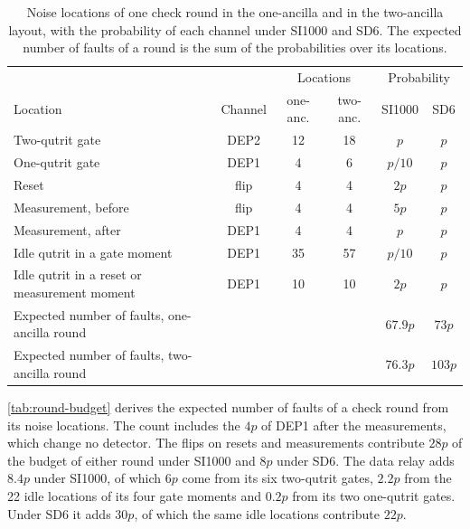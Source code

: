 \begin{table}[tp]
  \centering
  \begin{tabular}{l|c|c|c|c|c}
    \hline
    & & \multicolumn{2}{c|}{Locations} & \multicolumn{2}{c}{Probability} \\
    Location & Channel & one-anc. & two-anc. & SI1000 & SD6 \\
    \hline
    Two-qutrit gate & DEP2 & 12 & 18 & $p$ & $p$ \\
    One-qutrit gate & DEP1 & 4 & 6 & $p/10$ & $p$ \\
    Reset & flip & 4 & 4 & $2p$ & $p$ \\
    Measurement, before & flip & 4 & 4 & $5p$ & $p$ \\
    Measurement, after & DEP1 & 4 & 4 & $p$ & $p$ \\
    Idle qutrit in a gate moment & DEP1 & 35 & 57 & $p/10$ & $p$ \\
    Idle qutrit in a reset or measurement moment & DEP1 & 10 & 10 & $2p$ & $p$ \\
    \hline
    Expected number of faults, one-ancilla round & & & & $67.9p$ & $73p$ \\
    Expected number of faults, two-ancilla round & & & & $76.3p$ & $103p$ \\
    \hline
  \end{tabular}
  \caption{Noise locations of one check round in the one-ancilla and in the two-ancilla layout, with the probability of each channel under SI1000 and SD6. The expected number of faults of a round is the sum of the probabilities over its locations.}
  \label{tab:round-budget}
\end{table}

\autoref{tab:round-budget} derives the expected number of faults of a check round from its noise locations. The count includes the $4p$ of DEP1 after the measurements, which change no detector. The flips on resets and measurements contribute $28p$ of the budget of either round under SI1000 and $8p$ under SD6. The data relay adds $8.4p$ under SI1000, of which $6p$ come from its six two-qutrit gates, $2.2p$ from the 22 idle locations of its four gate moments and $0.2p$ from its two one-qutrit gates. Under SD6 it adds $30p$, of which the same idle locations contribute $22p$.

